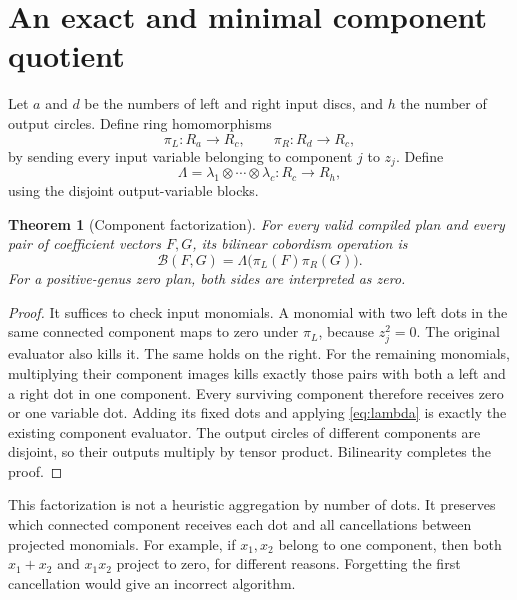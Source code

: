 \documentclass[11pt]{article}
\newtheorem{theorem}{Theorem}[section]
\theoremstyle{definition}\newtheorem{definition}[theorem]{Definition}
\theoremstyle{remark}\newtheorem{remark}[theorem]{Remark}
\begin{document}
\section{An exact and minimal component quotient}
\label{sec:quotient}
Let $a$ and $d$ be the numbers of left and right input discs, and $h$ the number of output circles. Define ring homomorphisms
\[
 \pi_L:R_a\longrightarrow R_c,\qquad
 \pi_R:R_d\longrightarrow R_c,
\]
by sending every input variable belonging to component $j$ to $z_j$. Define
\[
 \Lambda=\lambda_1\otimes\cdots\otimes\lambda_c:R_c\longrightarrow R_h,
\]
using the disjoint output-variable blocks.

\begin{theorem}[Component factorization]\label{thm:factor}
For every valid compiled plan and every pair of coefficient vectors $F,G$, its bilinear cobordism operation is
\begin{equation}\label{eq:factor}
 \mathcal B(F,G)=\Lambda\bigl(\pi_L(F)\pi_R(G)\bigr).
\end{equation}
For a positive-genus zero plan, both sides are interpreted as zero.
\end{theorem}
\begin{proof}
It suffices to check input monomials. A monomial with two left dots in the same connected component maps to zero under $\pi_L$, because $z_j^2=0$. The original evaluator also kills it. The same holds on the right. For the remaining monomials, multiplying their component images kills exactly those pairs with both a left and a right dot in one component. Every surviving component therefore receives zero or one variable dot. Adding its fixed dots and applying \eqref{eq:lambda} is exactly the existing component evaluator. The output circles of different components are disjoint, so their outputs multiply by tensor product. Bilinearity completes the proof.
\end{proof}

This factorization is not a heuristic aggregation by number of dots. It preserves which connected component receives each dot and all cancellations between projected monomials. For example, if $x_1,x_2$ belong to one component, then both $x_1+x_2$ and $x_1x_2$ project to zero, for different reasons. Forgetting the first cancellation would give an incorrect algorithm.
\end{document}
